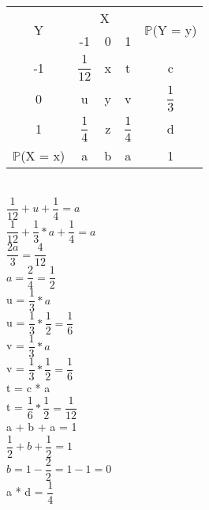 \documentclass[12pt,a4paper]{article}
\begin{document}
\begin{center}
	\begin{tabular}{|c|c|c|c|c|} \hline
		\multirow{2}{*}{Y} & \multicolumn{3}{c|}{X} & \multirow{2}{*}{$\mathbb{P}$(Y = y)}\\ \cline{2-4}
		& -1 & 0 & 1 & \\ \hline
		-1 & $\dfrac{1}{12}$ & x & t & c \\ \hline
		0 & u & y & v & $\dfrac{1}{3}$\\ \hline
		1 & $\dfrac{1}{4}$ & z & $\dfrac{1}{4}$ & d \\ \hline
		$\mathbb{P}$(X = x) & a & b & a & 1\\ \hline
	\end{tabular}
	\vspace{1cm}\\
	$\dfrac{1}{12} + u + \dfrac{1}{4} =  a$
	\vspace{0.25cm}\\
	$\dfrac{1}{12} + \dfrac{1}{3} * a + \dfrac{1}{4} =  a$
	\vspace{0.25cm}\\
	$\dfrac{2a}{3} =  \dfrac{4}{12}$
	\vspace{0.25cm}\\
	$a =  \dfrac{2}{4} = \dfrac{1}{2}$
	\vspace{1cm}\\
	u = $\dfrac{1}{3} * a$
	\vspace{0.25cm}\\
	u = $\dfrac{1}{3} * \dfrac{1}{2} = \dfrac{1}{6}$
	\vspace{1cm}\\
	v = $\dfrac{1}{3} * a$
	\vspace{0.25cm}\\
	v = $\dfrac{1}{3} * \dfrac{1}{2} = \dfrac{1}{6}$
	\vspace{1cm}\\
	t = c * a
	\vspace{0.25cm}\\
	t = $\dfrac{1}{6} * \dfrac{1}{2} = \dfrac{1}{12}$
	\vspace{1cm}\\
	a + b + a = 1
	\vspace{0.25cm}\\
	$\dfrac{1}{2} + b + \dfrac{1}{2} = 1$
	\vspace{0.25cm}\\
	$b = 1 - \dfrac{2}{2} = 1 - 1 = 0$
	\vspace{1cm}\\
	a * d = $\dfrac{1}{4}$

\end{center}
\end{document}
